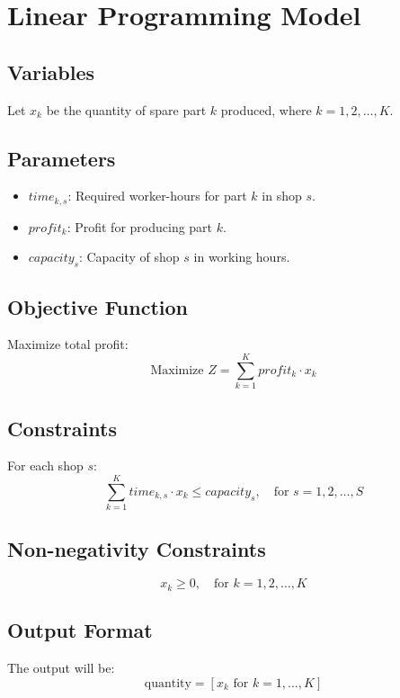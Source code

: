 \documentclass{article}
\begin{document}
\section*{Linear Programming Model}

\subsection*{Variables}
Let \( x_k \) be the quantity of spare part \( k \) produced, where \( k = 1, 2, \ldots, K \).

\subsection*{Parameters}
\begin{itemize}
    \item \( time_{k,s} \): Required worker-hours for part \( k \) in shop \( s \).
    \item \( profit_k \): Profit for producing part \( k \).
    \item \( capacity_s \): Capacity of shop \( s \) in working hours.
\end{itemize}

\subsection*{Objective Function}
Maximize total profit:
\[
\text{Maximize } Z = \sum_{k=1}^{K} profit_k \cdot x_k
\]

\subsection*{Constraints}
For each shop \( s \):
\[
\sum_{k=1}^{K} time_{k,s} \cdot x_k \leq capacity_s, \quad \text{for } s = 1, 2, \ldots, S
\]

\subsection*{Non-negativity Constraints}
\[
x_k \geq 0, \quad \text{for } k = 1, 2, \ldots, K
\]

\subsection*{Output Format}
The output will be:
\[
\text{{quantity}} = [x_k \text{ for } k = 1, \ldots, K]
\]
\end{document}
